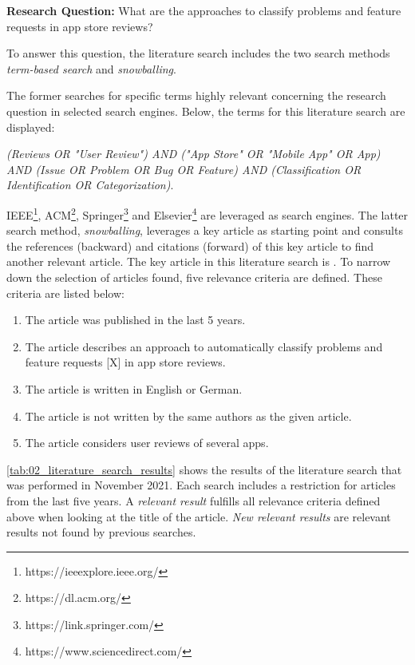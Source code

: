 \textbf{Research Question:} What are the approaches to classify problems and feature requests in app store reviews?

To answer this question, the literature search includes the two search methods \textit{term-based search} and \textit{snowballing}. 

The former searches for specific terms highly relevant concerning the research question in selected search engines. Below, the terms for this literature search are displayed: 

\textit{(Reviews OR "User Review") AND ("App Store" OR "Mobile App" OR App) AND (Issue OR Problem OR Bug OR Feature) AND (Classification OR Identification OR Categorization)}. 

IEEE\footnote{https://ieeexplore.ieee.org/}, ACM\footnote{ https://dl.acm.org/}, Springer\footnote{https://link.springer.com/} and Elsevier\footnote{ https://www.sciencedirect.com/} are leveraged as search engines. The latter search method, \textit{snowballing}, leverages a key article as starting point and consults the references (backward) and citations (forward) of this key article to find another relevant article. The key article in this literature search is \cite{Ciurumelea.2017}. To narrow down the selection of articles found, five relevance criteria are defined. These criteria are listed below:

\begin{enumerate}
    \item The article was published in the last 5 years.
    \item The article describes an approach to automatically classify problems and feature requests [X] in app store reviews.
    \item The article is written in English or German.
    \item The article is not written by the same authors as the given article.
    \item The article considers user reviews of several apps.
\end{enumerate}


\autoref{tab:02_literature_search_results} shows the results of the literature search that was performed in November 2021. Each search includes a restriction for articles from the last five years. A \textit{relevant result} fulfills all relevance criteria defined above when looking at the title of the article. \textit{New relevant results} are relevant results not found by previous searches.


